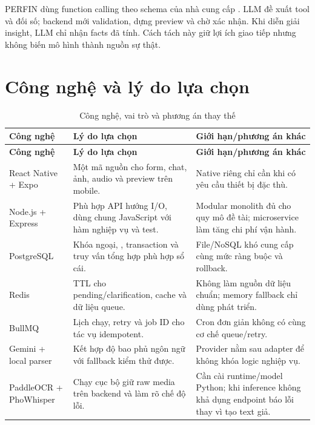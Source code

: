 PERFIN dùng function calling theo schema của nhà cung cấp \cite{geminifunctioncalling}. LLM đề xuất tool và đối số; backend mới validation, dựng preview và chờ xác nhận. Khi diễn giải insight, LLM chỉ nhận facts đã tính. Cách tách này giữ lợi ích giao tiếp nhưng không biến mô hình thành nguồn sự thật.

\section{Công nghệ và lý do lựa chọn}
\label{sec:tech-rationale}

\begin{longtable}{@{}L{3.0cm}L{5.6cm}L{5.3cm}@{}}
  \caption{Công nghệ, vai trò và phương án thay thế}\label{tab:technology-rationale}\\
  \toprule
  \textbf{Công nghệ} & \textbf{Lý do lựa chọn} & \textbf{Giới hạn/phương án khác} \\
  \midrule
  \endfirsthead
  \toprule
  \textbf{Công nghệ} & \textbf{Lý do lựa chọn} & \textbf{Giới hạn/phương án khác} \\
  \midrule
  \endhead
  React Native + Expo & Một mã nguồn cho form, chat, ảnh, audio và preview trên mobile. & Native riêng chỉ cần khi có yêu cầu thiết bị đặc thù. \\
  Node.js + Express & Phù hợp API hướng I/O, dùng chung JavaScript với hàm nghiệp vụ và test. & Modular monolith đủ cho quy mô đề tài; microservice làm tăng chi phí vận hành. \\
  PostgreSQL \cite{postgresql2026} & Khóa ngoại, , transaction và truy vấn tổng hợp phù hợp sổ cái. & File/NoSQL khó cung cấp cùng mức ràng buộc và rollback. \\
  Redis \cite{redisexpire} & TTL cho pending/clarification, cache và dữ liệu queue. & Không làm nguồn dữ liệu chuẩn; memory fallback chỉ dùng phát triển. \\
  BullMQ \cite{bullmq2026} & Lịch chạy, retry và job ID cho tác vụ idempotent. & Cron đơn giản không có cùng cơ chế queue/retry. \\
  Gemini + local parser & Kết hợp độ bao phủ ngôn ngữ với fallback kiểm thử được. & Provider nằm sau adapter để không khóa logic nghiệp vụ. \\
  PaddleOCR + PhoWhisper & Chạy cục bộ giữ raw media trên backend và làm rõ chế độ lỗi. & Cần cài runtime/model Python; khi inference không khả dụng endpoint báo lỗi thay vì tạo text giả. \\
  \bottomrule
\end{longtable}

